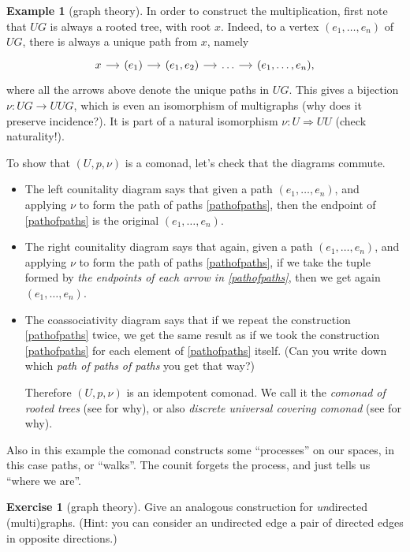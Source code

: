 \documentclass[12pt,oneside]{scrbook}
\numberwithin{equation}{section}
\theoremstyle{plain}
\theoremstyle{definition}
\newtheorem{eg}[thm]{Example}
\newtheorem{ex}[thm]{Exercise}
\newcommand{\ar}[2][]{\arrow{#2}{#1}}
\DeclareMathOperator{\1}{\mathbbm{1}}
\DeclareMathOperator{\2}{\mathbbm{2}}
\begin{document}
\begin{eg}[graph theory]
 In order to construct the multiplication, first note that $UG$ is always a rooted tree, with root $x$. Indeed, to a vertex $(e_1,\dots,e_n)$ of $UG$, there is always a unique path from $x$, namely
 \begin{equation}\label{pathofpaths}
 \begin{tikzcd}[sep=small]
  x \ar{r} & (e_1) \ar{r} & (e_1,e_2) \ar{r} &\dots \ar{r} & (e_1,\dots,e_n) ,
 \end{tikzcd}
 \end{equation}
 where all the arrows above denote the unique paths in $UG$.
 This gives a bijection $\nu:UG\to UUG$,
 which is even an isomorphism of multigraphs (why does it preserve incidence?). It is part of a natural isomorphism $\nu:U\Rightarrow UU$ (check naturality!).
 
 To show that $(U,p,\nu)$ is a comonad, let's check that the diagrams  commute. 
 \begin{itemize}
  \item The left counitality diagram says that given a path $(e_1,\dots,e_n)$, and applying $\nu$ to form the path of paths \eqref{pathofpaths},
  then the endpoint of \eqref{pathofpaths} is the original $(e_1,\dots,e_n)$.
  \item The right counitality diagram says that again, given a path $(e_1,\dots,e_n)$, and applying $\nu$ to form the path of paths \eqref{pathofpaths}, if we take the tuple formed by \emph{the endpoints of each arrow in \eqref{pathofpaths}}, then we get again $(e_1,\dots,e_n)$.
  \item The coassociativity diagram says that if we repeat the construction \eqref{pathofpaths} twice, we get the same result as if we took the construction \eqref{pathofpaths} for each element of \eqref{pathofpaths} itself. (Can you write down which \emph{path of paths of paths} you get that way?)
  
  Therefore $(U,p,\nu)$ is an idempotent comonad. We call it the \emph{comonad of rooted trees} (see  for why), or also \emph{discrete universal covering comonad} (see  for why). 
 \end{itemize}
\end{eg}

Also in this example the comonad constructs some ``processes'' on our spaces, in this case paths, or ``walks''. The counit forgets the process, and just tells us ``where we are''.

\begin{ex}[graph theory]\label{ucugraph}
 Give an analogous construction for \emph{un}directed (multi)graphs. (Hint: you can consider an undirected edge a pair of directed edges in opposite directions.)
\end{ex}
\end{document}
